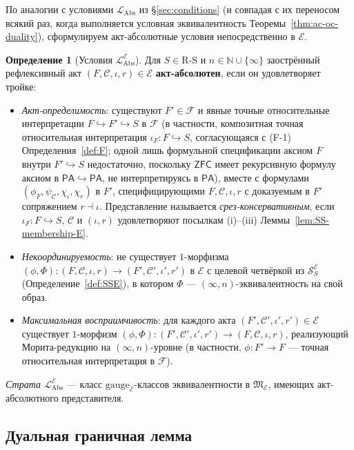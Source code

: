 \documentclass[11pt]{article}
\theoremstyle{plain}
\theoremstyle{definition}
\newtheorem{definition}[theorem]{Определение}
\newcommand{\RS}{\mathrm{R\text{-}S}}
\newcommand{\cS}{\mathcal{S}}
\newcommand{\cF}{\mathcal{F}}
\newcommand{\cC}{\mathcal{C}}
\newcommand{\fM}{\mathfrak{M}}
\newcommand{\LAbs}{\mathcal{L}_{\mathrm{Abs}}}
\newcommand{\PA}{\mathsf{PA}}
\newcommand{\ZFC}{\mathsf{ZFC}}
\newcommand{\cE}{\mathcal{E}}
\newcommand{\LAbsE}{\LAbs^{\cE}}
\newcommand{\SSE}{\cS_{S}^{\cE}}
\begin{document}
По аналогии с условиями $\LAbs$ из \S\ref{sec:conditions} (и совпадая с их переносом всякий раз, когда выполняется условная эквивалентность Теоремы~\ref{thm:ac-oc-duality}), сформулируем акт-абсолютные условия непосредственно в $\cE$.

\begin{definition}[Условия $\LAbsE$]\label{def:level6-cE}
Для $S \in \RS$ и $n \in \mathbb{N} \cup \{\infty\}$ заострённый рефлексивный акт $(F, \cC, \iota, r) \in \cE$ \textbf{акт-абсолютен}, если он удовлетворяет тройке:
\begin{itemize}
\item[$(\tilde{F}_S)$] \emph{Акт-определимость}: существуют $F' \in \cF$ и явные точные относительные интерпретации $F \hookrightarrow F' \hookrightarrow S$ в $\cF$ (в частности, композитная точная относительная интерпретация $\iota_F : F \hookrightarrow S$, согласующаяся с (F-1) Определения~\ref{def:F}; одной лишь формульной спецификации аксиом $F$ внутри $F' \hookrightarrow S$ недостаточно, поскольку $\ZFC$ имеет рекурсивную формулу аксиом в $\PA \hookrightarrow \PA$, не интерпретируясь в $\PA$), вместе с формулами $(\phi_F, \psi_\cC, \chi_\iota, \chi_r)$ в $F'$, специфицирующими $F, \cC, \iota, r$ с доказуемым в $F'$ сопряжением $r \dashv \iota$. Представление называется \emph{срез-консервативным}, если $\iota_F : F \hookrightarrow S$, $\cC$ и $(\iota, r)$ удовлетворяют посылкам (i)--(iii) Леммы~\ref{lem:SS-membership-E}.
\item[$(\tilde{\Pi}_{4, S, n})$] \emph{Некоординируемость}: не существует $1$-морфизма $(\phi, \Phi) : (F, \cC, \iota, r) \to (F', \cC', \iota', r')$ в $\cE$ с целевой четвёркой из $\SSE$ (Определение~\ref{def:SSE}), в котором $\Phi$ — $(\infty, n)$-эквивалентность на свой образ.
\item[$(\tilde{\Pi}_{3\text{-max}, S, n})$] \emph{Максимальная восприимчивость}: для каждого акта $(F', \cC', \iota', r') \in \cE$ существует $1$-морфизм $(\phi, \Phi) : (F', \cC', \iota', r') \to (F, \cC, \iota, r)$, реализующий Морита-редукцию на $(\infty, n)$-уровне (в частности, $\phi : F' \to F$ — точная относительная интерпретация в $\cF$).
\end{itemize}
\emph{Страта $\LAbsE$} — класс $\mathrm{gauge}_\cE$-классов эквивалентности в $\fM_\cE$, имеющих акт-абсолютного представителя.
\end{definition}

\subsection{Дуальная граничная лемма}
\end{document}
